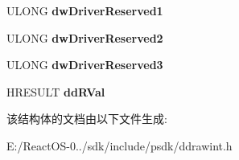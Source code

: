 \begin{DoxyCompactItemize}
U\+L\+O\+NG {\bfseries dw\+Driver\+Reserved1}
\item 
\mbox{\label{struct___d_d___s_y_n_c_v_i_d_e_o_p_o_r_t_d_a_t_a_a2ed80ea65dde825f015f8d1235087c9f}} 
U\+L\+O\+NG {\bfseries dw\+Driver\+Reserved2}
\item 
\mbox{\label{struct___d_d___s_y_n_c_v_i_d_e_o_p_o_r_t_d_a_t_a_a68334710eb1c8cb29e7f7d96c02051fa}} 
U\+L\+O\+NG {\bfseries dw\+Driver\+Reserved3}
\item 
\mbox{\label{struct___d_d___s_y_n_c_v_i_d_e_o_p_o_r_t_d_a_t_a_a9507efed677acc31fbaacd2d96180055}} 
H\+R\+E\+S\+U\+LT {\bfseries dd\+R\+Val}
\end{DoxyCompactItemize}


该结构体的文档由以下文件生成\+:\begin{DoxyCompactItemize}
\item 
E\+:/\+React\+O\+S-\/0../sdk/include/psdk/ddrawint.\+h\end{DoxyCompactItemize}
